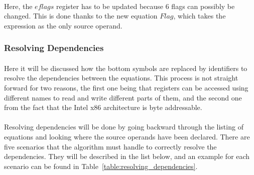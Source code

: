 \paragraph{}
Here, the $eflags$ register has to be updated because 6 flags can possibly be changed. This is done thanks to the new equation $Flag$, which takes the expression as the only source operand.

\subsubsection{Resolving Dependencies}
\paragraph{}
Here it will be discussed how the bottom symbols are replaced by identifiers to resolve the dependencies between the equations. This process is not straight forward for two reasons, the first one being that registers can be accessed using different names to read and write different parts of them, and the second one from the fact that the Intel x86 architecture is byte addressable.

\paragraph{}
Resolving dependencies will be done by going backward through the listing of equations and looking where the source operands have been declared. There are five scenarios that the algorithm must handle to correctly resolve the dependencies. They will be described in the list below, and an example for each scenario can be found in Table~\ref{table:resolving_dependencies}.

